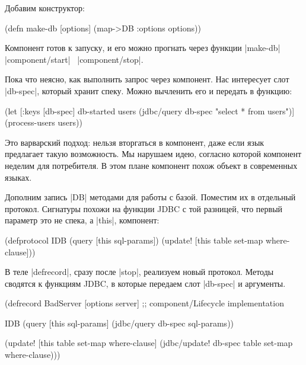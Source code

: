 Добавим конструктор:

\begin{english}
  \begin{clojure}
(defn make-db [options]
  (map->DB {:options options}))
  \end{clojure}
\end{english}

Компонент готов к запуску, и его можно прогнать через функции
\spverb|make-db|~\arr{} \spverb|component/start|~\arr{} \spverb|component/stop|.

Пока что неясно, как выполнить запрос через компонент. Нас интересует слот
\spverb|db-spec|, который хранит спеку. Можно вычленить его и передать в
функцию:

\begin{english}
  \begin{clojure}
(let [{:keys [db-spec]} db-started
      users (jdbc/query db-spec "select * from users")]
  (process-users users))
  \end{clojure}
\end{english}

Это варварский подход: нельзя вторгаться в компонент, даже если язык предлагает
такую возможность. Мы нарушаем идею, согласно которой компонент неделим для
потребителя. В этом плане компонент похож объект в современных языках.

Дополним запись \spverb|DB| методами для работы с базой. Поместим их в отдельный
протокол. Сигнатуры похожи на функции JDBC с той разницей, что первый параметр
это не спека, а \spverb|this|, компонент:

\begin{english}
  \begin{clojure}
(defprotocol IDB
  (query [this sql-params])
  (update! [this table set-map where-clause]))
  \end{clojure}
\end{english}

В теле \spverb|defrecord|, сразу после \spverb|stop|, реализуем новый
протокол. Методы сводятся к функциям JDBC, в которые передаем слот
\spverb|db-spec| и аргументы.

\begin{english}
  \begin{clojure}
(defrecord BadServer [options server]
  ;; component/Lifecycle implementation

  IDB
  (query [this sql-params]
    (jdbc/query db-spec sql-params))

  (update! [this table set-map where-clause]
    (jdbc/update! db-spec table set-map where-clause)))
  \end{clojure}
\end{english}

